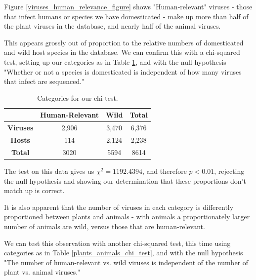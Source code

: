 \documentclass[12pt]{article}
\begin{document}
    Figure \ref{viruses_human_relevance_figure} shows "Human-relevant" viruses
    - those that infect humans or species we have domesticated - make up more
    than half of the plant viruses in the database, and nearly half of the animal
    viruses.
    
    This appears grossly out of proportion to the relative numbers of domesticated
    and wild host species in the database. We can confirm this with a chi-squared
    test, setting up our categories as in Table \ref{domestic_wild_chi_test}, and
    with the null hypothesis "Whether or not a species is domesticated is independent
    of how many viruses that infect are sequenced."

    \begin{table}[H]
        \begin{center}
            \begin{tabular}{|c|c|c|c|}
                \hline
                                 & \textbf{Human-Relevant} & \textbf{Wild} & \textbf{Total} \\ \hline
                \textbf{Viruses} & 2,906                   & 3,470         & 6,376          \\ \hline
                \textbf{Hosts}   & 114                     & 2,124         & 2,238          \\ \hline
                \textbf{Total}   & 3020                    & 5594          & 8614           \\ \hline
            \end{tabular}
        \end{center}
        \caption{Categories for our chi test.}
        \label{domestic_wild_chi_test}
    \end{table}

    The test on this data gives us $\chi^2 = 1192.4394$, and therefore $p < 0.01$,
    rejecting the null hypothesis and showing our determination that these proportions
    don't match up is correct.

    It is also apparent that the number of viruses in each category is differently
    proportioned between plants and animals - with animals a proportionately
    larger number of animals are wild, versus those that are human-relevant.

    We can test this observation with another chi-squared test, this time using
    categories as in Table \ref{plants_animals_chi_test}, and with the null
    hypothesis "The number of human-relevant vs. wild viruses is independent of
    the number of plant vs. animal viruses."
\end{document}
